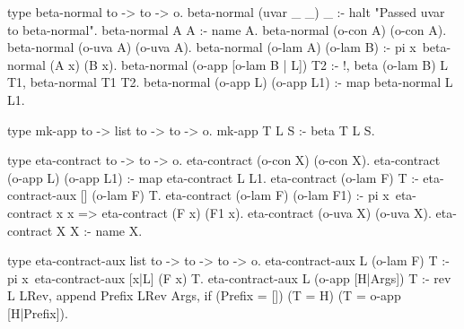 \begin{elpicode}
  type beta-normal to -> to -> o.
  beta-normal (uvar _ _) _ :- halt "Passed uvar to beta-normal".
  beta-normal A A :- name A.
  beta-normal (o-con A) (o-con A).
  beta-normal (o-uva A) (o-uva A).
  beta-normal (o-lam A) (o-lam B) :-
    pi x\ beta-normal (A x) (B x).
  beta-normal (o-app [o-lam B | L]) T2 :- !,
    beta (o-lam B) L T1, beta-normal T1 T2.
  beta-normal (o-app L) (o-app L1) :-
    map beta-normal L L1.

  type mk-app to -> list to -> to -> o.
  mk-app T L S :- beta T L S.

  type eta-contract to -> to -> o.
  eta-contract (o-con X) (o-con X).
  eta-contract (o-app L) (o-app L1) :- map eta-contract L L1.
  eta-contract (o-lam F) T :- eta-contract-aux [] (o-lam F) T.
  eta-contract (o-lam F) (o-lam F1) :-
    pi x\ eta-contract x x => eta-contract (F x) (F1 x).
  eta-contract (o-uva X) (o-uva X).
  eta-contract X X :- name X.

  type eta-contract-aux list to -> to -> to -> o.
  eta-contract-aux L (o-lam F) T :- 
    pi x\ eta-contract-aux [x|L] (F x) T. %
  eta-contract-aux L (o-app [H|Args]) T :- 
    rev L LRev, append Prefix LRev Args,
    if (Prefix = []) (T = H) (T = o-app [H|Prefix]).
\end{elpicode}
